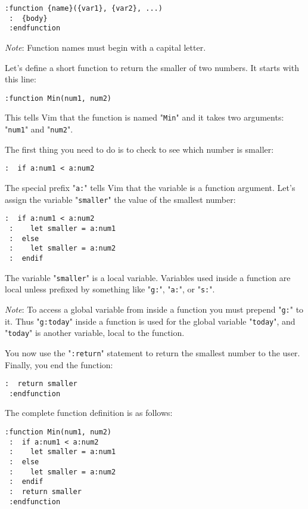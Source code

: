 \begin{Verbatim}[samepage=true]
 :function {name}({var1}, {var2}, ...)
 :  {body}
 :endfunction
\end{Verbatim}

\emph{Note}:
Function names must begin with a capital letter.

Let's define a short function to return the smaller of two numbers.
It starts with this line:

\begin{Verbatim}[samepage=true]
 :function Min(num1, num2)
\end{Verbatim}

This tells Vim that the function is named "\texttt{Min}" and it takes two arguments: "\texttt{num1}" and "\texttt{num2}".

The first thing you need to do is to check to see which number is smaller:

\begin{Verbatim}[samepage=true]
 :  if a:num1 < a:num2
\end{Verbatim}

The special prefix "\texttt{a:}" tells Vim that the variable is a function argument.
Let's assign the variable "\texttt{smaller}" the value of the smallest number:

\begin{Verbatim}[samepage=true]
 :  if a:num1 < a:num2
 :    let smaller = a:num1
 :  else
 :    let smaller = a:num2
 :  endif
\end{Verbatim}

The variable "\texttt{smaller}" is a local variable.
Variables used inside a function are local unless prefixed by something like "\texttt{g:}", "\texttt{a:}", or "\texttt{s:}".

\emph{Note}:
To access a global variable from inside a function you must prepend "\texttt{g:}" to it.
Thus "\texttt{g:today}" inside a function is used for the global variable "\texttt{today}", and "\texttt{today}" is another variable, local to the function.

You now use the "\texttt{:return}" statement to return the smallest number to the user.
Finally, you end the function:

\begin{Verbatim}[samepage=true]
 :  return smaller
 :endfunction
\end{Verbatim}

The complete function definition is as follows:

\begin{Verbatim}[samepage=true]
 :function Min(num1, num2)
 :  if a:num1 < a:num2
 :    let smaller = a:num1
 :  else
 :    let smaller = a:num2
 :  endif
 :  return smaller
 :endfunction
\end{Verbatim}

